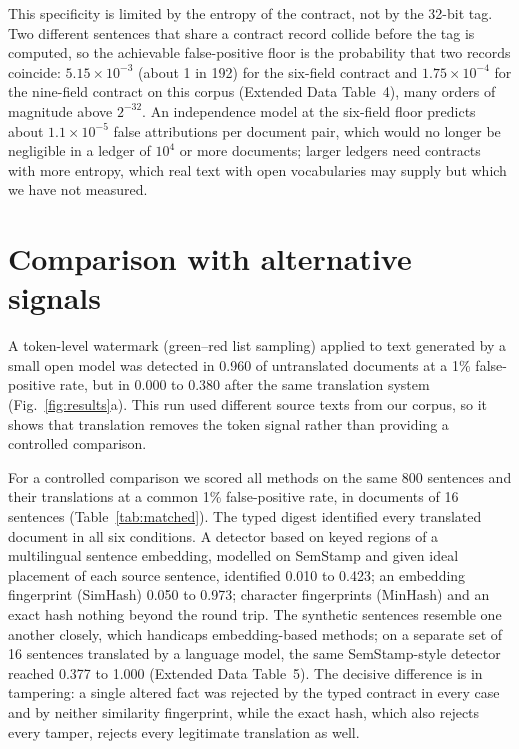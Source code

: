 \documentclass[12pt]{article}
\begin{document}
This specificity is limited by the entropy of the contract, not by the 32-bit tag. Two different sentences that share a contract record collide before the tag is computed, so the achievable false-positive floor is the probability that two records coincide: $5.15\times10^{-3}$ (about 1 in 192) for the six-field contract and $1.75\times10^{-4}$ for the nine-field contract on this corpus (Extended Data Table~4), many orders of magnitude above $2^{-32}$. An independence model at the six-field floor predicts about $1.1\times10^{-5}$ false attributions per document pair, which would no longer be negligible in a ledger of $10^4$ or more documents; larger ledgers need contracts with more entropy, which real text with open vocabularies may supply but which we have not measured.

\section*{Comparison with alternative signals}

A token-level watermark (green--red list sampling\cite{kirchenbauer2023kgw}) applied to text generated by a small open model was detected in 0.960 of untranslated documents at a 1\% false-positive rate, but in 0.000 to 0.380 after the same translation system (Fig.~\ref{fig:results}a). This run used different source texts from our corpus, so it shows that translation removes the token signal rather than providing a controlled comparison.

For a controlled comparison we scored all methods on the same 800 sentences and their translations at a common 1\% false-positive rate, in documents of 16 sentences (Table~\ref{tab:matched}). The typed digest identified every translated document in all six conditions. A detector based on keyed regions of a multilingual sentence embedding, modelled on SemStamp\cite{hou2024semstamp} and given ideal placement of each source sentence, identified 0.010 to 0.423; an embedding fingerprint (SimHash\cite{charikar2002simhash}) 0.050 to 0.973; character fingerprints (MinHash\cite{broder1997minhash}) and an exact hash nothing beyond the round trip. The synthetic sentences resemble one another closely, which handicaps embedding-based methods; on a separate set of 16 sentences translated by a language model, the same SemStamp-style detector reached 0.377 to 1.000 (Extended Data Table~5). The decisive difference is in tampering: a single altered fact was rejected by the typed contract in every case and by neither similarity fingerprint, while the exact hash, which also rejects every tamper, rejects every legitimate translation as well.
\end{document}
